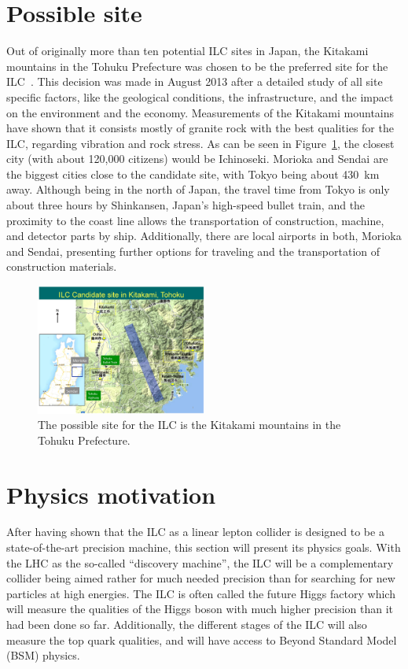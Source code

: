 \section{Possible site}
\label{ILC:site}
Out of originally more than ten potential ILC sites in Japan, the Kitakami mountains in the Tohuku Prefecture was chosen to be the preferred site for the ILC~\cite{Site}.
This decision was made in August 2013 after a detailed study of all site specific factors, like the geological conditions, the infrastructure, and the impact on the environment and the economy.
Measurements of the Kitakami mountains have shown that it consists mostly of granite rock with the best qualities for the ILC, regarding vibration and rock stress.
As can be seen in Figure~\ref{fig:ILC_Site}, the closest city (with about 120,000 citizens) would be Ichinoseki.
Morioka and Sendai are the biggest cities close to the candidate site, with Tokyo being about \SI{430}{\kilo\meter} away.
Although being in the north of Japan, the travel time from Tokyo is only about three hours by Shinkansen, Japan's high-speed bullet train, and the proximity to the coast line allows the transportation of construction, machine, and detector parts by ship.
Additionally, there are local airports in both, Morioka and Sendai, presenting further options for traveling and the transportation of construction materials.
\begin{figure}
\centering
\includegraphics[width=0.5\textwidth]{Figures/ILC-site.jpg}
\caption[Possible site for the ILC]{The possible site for the ILC is the Kitakami mountains in the Tohuku Prefecture.\cite{Kitakami}}
\label{fig:ILC_Site}
\end{figure}

\section{Physics motivation}
\label{ILC:physicsmotivation}
After having shown that the ILC as a linear lepton collider is designed to be a state-of-the-art precision machine, this section will present its physics goals.
With the LHC as the so-called ``discovery machine'', the ILC will be a complementary collider being aimed rather for much needed precision than for searching for new particles at high energies.
The ILC is often called the future Higgs factory which will measure the qualities of the Higgs boson with much higher precision than it had been done so far.
Additionally, the different stages of the ILC will also measure the top quark qualities, and will have access to Beyond Standard Model (BSM) physics.
 
